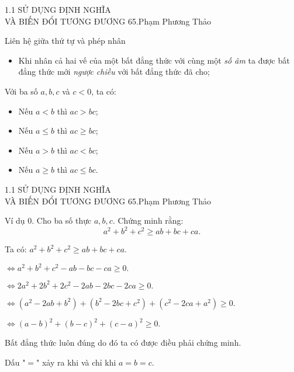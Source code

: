 \begin{frame}{1.1 SỬ DỤNG ĐỊNH NGHĨA \\ VÀ BIẾN ĐỔI TƯƠNG ĐƯƠNG \hspace{3cm}  65.Phạm Phương Thảo}
\begin{block}{Liên hệ giữa thứ tự và phép nhân}
\begin{itemize}
    \item Khi nhân cả hai vế của một bất đẳng thức với cùng một \textit{số âm} ta được bất đẳng thức mới \textit{ngược chiều} với bất đẳng thức đã cho; 
\end{itemize}
\end{block}
\pause
Với ba số $a, b, c$ và $c<0$, ta có:
\begin{itemize}
    \item Nếu $a<b$ thì $ac>bc$;
    \item Nếu $a\leq b$ thì $ac \geq bc$;
    \item Nếu $a>b$ thì $ac<bc$;
    \item Nếu $a\geq b$ thì $ac\leq bc$.
\end{itemize}
\end{frame}

\begin{frame}{1.1 SỬ DỤNG ĐỊNH NGHĨA \\ VÀ BIẾN ĐỔI TƯƠNG ĐƯƠNG \hspace{3cm}  65.Phạm Phương Thảo}
\begin{block}{Ví dụ 0.}
Cho ba số thực $a, b, c$. Chứng minh rằng: $$a^2+b^2+c^2 \geq ab+bc+ca.$$
\end{block}
\pause
Ta có:
$a^2+b^2+c^2 \geq ab+bc+ca.$

$\Leftrightarrow a^2+b^2+c^2-ab-bc-ca \geq 0.$

\pause
$\Leftrightarrow 2a^2+2b^2+2c^2-2ab-2bc-2ca \geq 0.$
\pause

$\Leftrightarrow (a^2-2ab+b^2)+(b^2-2bc+c^2)+(c^2-2ca+a^2) \geq 0.$

$\Leftrightarrow (a-b)^2+(b-c)^2+(c-a)^2 \geq 0.$

\pause
Bất đẳng thức luôn đúng do đó ta có được điều phải chứng minh.

Dấu "$=$" xảy ra khi và chỉ khi $a=b=c$.
\end{frame}

